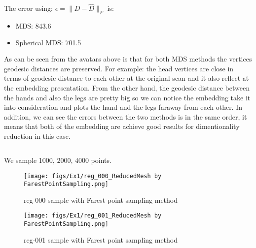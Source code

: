 The error using: \(\epsilon=\|D-\hat{D}\|_F\) is:
\begin{itemize}
\item MDS: 843.6
\item Spherical MDS: 701.5
\end{itemize}

As can be seen from the avatars above is that for both MDS methods the vertices geodesic distances are preserved. For example: the head vertices are close in terms of geodesic distance to each other at the original scan and it also reflect at the embedding presentation. From the other hand, the geodesic distance between the hands and also the legs are pretty big so we can notice the embedding take it into consideration and plots the hand and the legs faraway from each other.  
In addition, we can see the errors between the two methods is in the same order, it means that both of the embedding are achieve good results for dimentionality reduction in this case.

\clearpage
\subsection{}
We sample 1000, 2000, 4000 points.
\begin{figure*}[h]
\centering
\texttt{[image: figs/Ex1/reg\_000\_ReducedMesh by FarestPointSampling.png]} 
\caption{\small reg-000 sample with Farest point sampling method}
\end{figure*}
\begin{figure*}[h]
\centering
\texttt{[image: figs/Ex1/reg\_001\_ReducedMesh by FarestPointSampling.png]} 
\caption{\small reg-001 sample with Farest point sampling method}
\end{figure*}